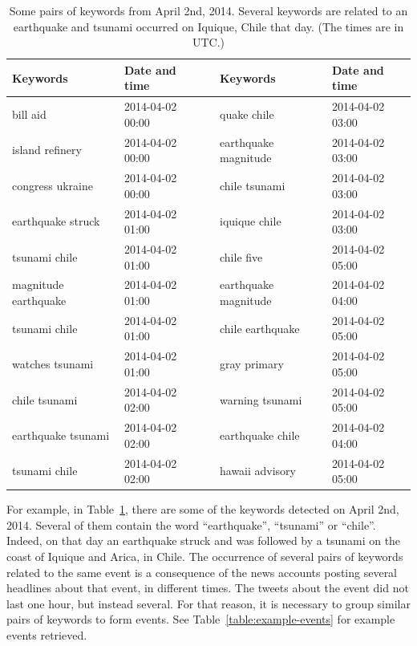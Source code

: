 \begin{table}

\begin{center}
\begin{tabular}{lllll}
\toprule
  Keywords              &  Date and time     &     &  Keywords              &  Date and time     \\
\midrule
 bill aid              &  2014-04-02 00:00  &     &  quake chile           &  2014-04-02 03:00  \\
 island refinery       &  2014-04-02 00:00  &     &  earthquake magnitude  &  2014-04-02 03:00  \\
 congress ukraine      &  2014-04-02 00:00  &     &  chile tsunami         &  2014-04-02 03:00  \\
 earthquake struck     &  2014-04-02 01:00  &     &  iquique chile         &  2014-04-02 03:00  \\
 tsunami chile         &  2014-04-02 01:00  &     &  chile five            &  2014-04-02 05:00  \\
 magnitude earthquake  &  2014-04-02 01:00  &     &  earthquake magnitude  &  2014-04-02 04:00  \\
 tsunami chile         &  2014-04-02 01:00  &     &  chile earthquake      &  2014-04-02 05:00  \\
 watches tsunami       &  2014-04-02 01:00  &     &  gray primary          &  2014-04-02 05:00  \\
 chile tsunami         &  2014-04-02 02:00  &     &  warning tsunami       &  2014-04-02 05:00  \\
 earthquake tsunami    &  2014-04-02 02:00  &     &  earthquake chile      &  2014-04-02 04:00  \\
 tsunami chile         &  2014-04-02 02:00  &     &  hawaii advisory       &  2014-04-02 05:00  \\
\bottomrule
\end{tabular}
\end{center}
\caption[Example pairs of keywords from April 2nd, 2014.]{Some pairs of
  keywords from April 2nd, 2014. Several keywords are related to an
  earthquake and tsunami occurred on Iquique, Chile that day. (The
  times are in UTC.)}\label{table:example-pairs}
\end{table}


For example, in Table~\ref{table:example-pairs}, there are some of the keywords
detected on April 2nd, 2014. 
%
Several of them contain the word ``earthquake'', ``tsunami'' or ``chile''.
%
Indeed, on that day an earthquake struck and was followed by a tsunami on the
coast of Iquique and Arica, in Chile. 
%
The occurrence of several pairs of keywords related to the same event is a
consequence of the news accounts posting several headlines about that event, in
different times. 
%
The tweets about the event did not last one hour, but instead several. 
%
For that reason, it is necessary to group similar pairs of keywords to form
events.
%
See Table~\ref{table:example-events} for example events retrieved.


